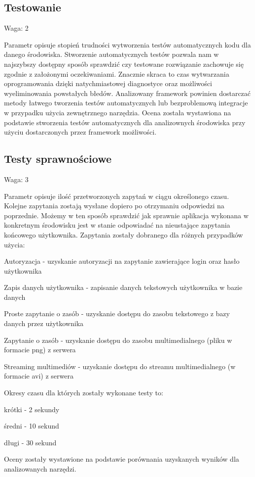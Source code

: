 \documentclass[12pt]{report}
\begin{document}
    \subsection{Testowanie}
      \begin{description}
        \item Waga: 2
      \end{description}
      Parametr opisuje stopień trudności wytworzenia testów automatycznych kodu dla danego środowiska.
      Stworzenie automatycznych testów pozwala nam w najszybszy dostępny sposób sprawdzić czy testowane rozwiązanie zachowuje się zgodnie z założonymi oczekiwaniami.
      Znacznie skraca to czas wytwarzania oprogramowania dzięki natychmiastowej diagnostyce oraz możliwości wyeliminowania powstałych błedów.
      Analizowany framework powinien dostarczać metody łatwego tworzenia testów automatycznych lub bezproblemową integracje w przypadku użycia zewnętrznego narzędzia.
      Ocena została wystawiona na podstawie stworzenia testów automatycznych dla analizownych środowiska przy użyciu dostarczonych przez framework możliwości.

    \subsection{Testy sprawnościowe}
      \begin{description}
        \item Waga: 3
      \end{description}
      Parametr opisuje ilość przetworzonych zapytań w ciągu określonego czasu.
      Kolejne zapytania zostają wysłane dopiero po otrzymaniu odpowiedzi na poprzednie.
      Możemy w ten sposób sprawdzić jak sprawnie aplikacja wykonana w konkretnym środowisku jest w stanie odpowiadać na nieustające zapytania końcowego użytkownika.
      Zapytania zostały dobranego dla różnych przypadków użycia:
      \begin{description}
        \item Autoryzacja - uzyskanie autoryzacji na zapytanie zawierające login oraz hasło użytkownika
        \item Zapis danych użytkownika - zapisanie danych tekstowych użytkownika w bazie danych
        \item Proste zapytanie o zasób - uzyskanie dostępu do zasobu tekstowego z bazy danych przez użytkownika
        \item Zapytanie o zasób - uzyskanie dostępu do zasobu multimedialnego (pliku w formacie png) z serwera
        \item Streaming multimediów - uzyskanie dostępu do streamu multimedialnego (w formacie avi) z serwera
      \end{description}
      Okresy czasu dla których zostały wykonane testy to:
      \begin{description}
        \item krótki - 2 sekundy
        \item średni - 10 sekund
        \item długi - 30 sekund
      \end{description}
      Oceny zostały wystawione na podstawie porównania uzyskanych wyników dla analizowanych narzędzi.
      
\end{document}
